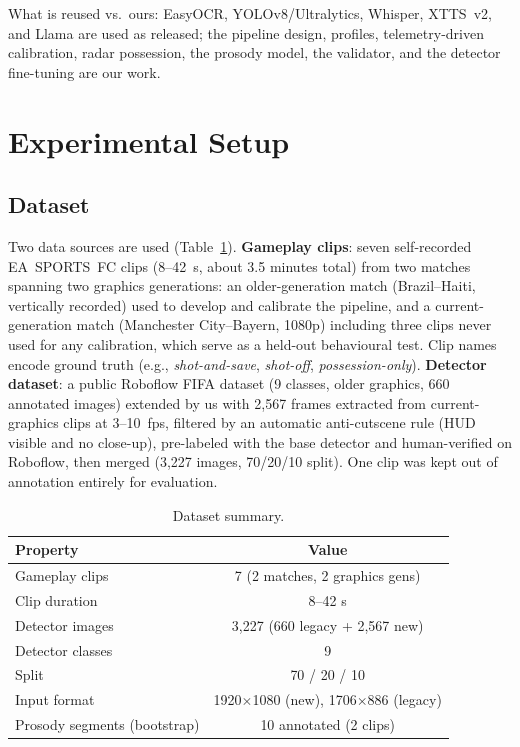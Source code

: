 \documentclass[10pt,twocolumn,a4paper]{article}
\begin{document}
	What is reused vs.\ ours: EasyOCR, YOLOv8/Ultralytics, Whisper, XTTS~v2, and Llama are used as released; the pipeline design, profiles, telemetry-driven calibration, radar possession, the prosody model, the validator, and the detector fine-tuning are our work.

	\section{Experimental Setup}

	\subsection{Dataset}

	Two data sources are used (Table~\ref{tab:dataset}). \textbf{Gameplay clips}: seven self-recorded EA~SPORTS~FC clips (8--42~s, about 3.5 minutes total) from two matches spanning two graphics generations: an older-generation match (Brazil--Haiti, vertically recorded) used to develop and calibrate the pipeline, and a current-generation match (Manchester City--Bayern, 1080p) including three clips never used for any calibration, which serve as a held-out behavioural test. Clip names encode ground truth (e.g., \emph{shot-and-save}, \emph{shot-off}, \emph{possession-only}). \textbf{Detector dataset}: a public Roboflow FIFA dataset (9 classes, older graphics, 660 annotated images) extended by us with 2{,}567 frames extracted from current-graphics clips at 3--10~fps, filtered by an automatic anti-cutscene rule (HUD visible and no close-up), pre-labeled with the base detector and human-verified on Roboflow, then merged (3{,}227 images, 70/20/10 split). One clip was kept out of annotation entirely for evaluation.

	\begin{table}[h]
		\centering
		\caption{Dataset summary.}
		\label{tab:dataset}
		\begin{tabular}{|l|c|}
			\hline
			\textbf{Property} & \textbf{Value} \\
			\hline
			Gameplay clips & 7 (2 matches, 2 graphics gens) \\
			Clip duration & 8--42 s \\
			Detector images & 3{,}227 (660 legacy + 2{,}567 new) \\
			Detector classes & 9 \\
			Split & 70 / 20 / 10 \\
			Input format & 1920$\times$1080 (new), 1706$\times$886 (legacy) \\
			Prosody segments (bootstrap) & 10 annotated (2 clips) \\
			\hline
		\end{tabular}
	\end{table}
\end{document}
